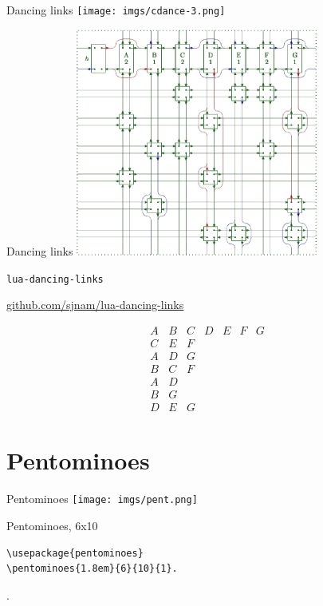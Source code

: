 \documentclass[xcolor=svgnames]{beamer}
\begin{document}
%
\begin{frame}{Dancing links}
  \centering\texttt{[image: imgs/cdance-3.png]}
\end{frame}

%
\begin{frame}{Dancing links}
  \centering\includegraphics[height=7.5cm]{imgs/cdance-4.png}
\end{frame}

%
\begin{frame}{\texttt{lua-dancing-links}}
\begin{center}
  \href{https://github.com/sjnam/lua-dancing-links}
       {github.com/sjnam/lua-dancing-links}
\end{center}
\boldmath
{
\large
$$
  \begin{array}{ccccccc}
    A & B & C & D & E & F & G\\
    C & E &F &&&&\\
    A & D & G &&&&\\
    B & C & F &&&&\\
    A & D &&&&&\\
    B & G &&&&&\\
    D & E & G &&&&
  \end{array}
$$
}
\end{frame}


\section{Pentominoes}

%
\begin{frame}[fragile]{Pentominoes}
  \centering\texttt{[image: imgs/pent.png]}
\end{frame}

%
\begin{frame}[fragile]{Pentominoes, 6x10}
\begin{verbatim}
\usepackage{pentominoes}
\pentominoes{1.8em}{6}{10}{1}.
\end{verbatim}  

.

\end{frame}
\end{document}
